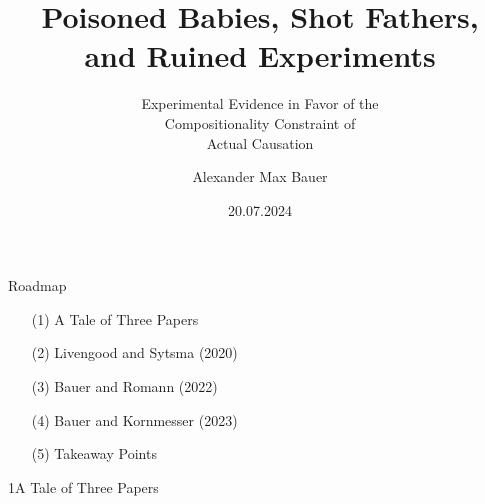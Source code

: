 \documentclass[xcolor=table,9pt,aspectratio=169]{beamer}
\title{Poisoned Babies, Shot Fathers,\\and Ruined Experiments}
\subtitle{Experimental Evidence in Favor of the\\Compositionality Constraint of\\Actual Causation}
\author{Alexander Max Bauer}
\date{20.07.2024}
\begin{document}
{
\begin{frame}
   \maketitle
\end{frame}
}


\begin{frame}{\vspace*{10mm}Roadmap}
\vspace*{-5mm}
\begin{itemize}
   \item[(1)] A Tale of Three Papers
   \item[(2)] Livengood and Sytsma (2020)
   \item[(3)] Bauer and Romann (2022)
   \item[(4)] Bauer and Kornmesser (2023)
   \item[(5)] Takeaway Points
\end{itemize}
\end{frame}


\begin{frame}
\begin{overlayarea}{\textwidth}{0.81\paperheight}{
   \vspace*{11mm}
   \textcolor{uolblue}
   {1\hspace*{1em}A Tale of Three Papers}
}
\end{overlayarea}
\end{frame}
\end{document}
